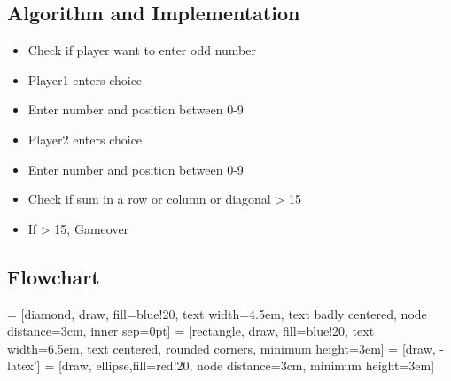 \documentclass[12pt]{article}
\begin{document}
  \subsection{Algorithm and Implementation}
  \begin{itemize}
  \item Check if player want to enter odd number
  \item Player1 enters choice
  \item Enter number and position between 0-9
  \item Player2 enters choice
  \item Enter number and position between 0-9
  \item Check if sum in a row or column or diagonal > 15
  \item If > 15, Gameover
  \end{itemize}
  \subsection{Flowchart}
   = [diamond, draw, fill=blue!20, 
    text width=4.5em, text badly centered, node distance=3cm, inner sep=0pt]
 = [rectangle, draw, fill=blue!20, 
    text width=6.5em, text centered, rounded corners, minimum height=3em]
 = [draw, -latex']
 = [draw, ellipse,fill=red!20, node distance=3cm,
    minimum height=3em]
  \begin{center}    
\end{center}
  
\end{document}
